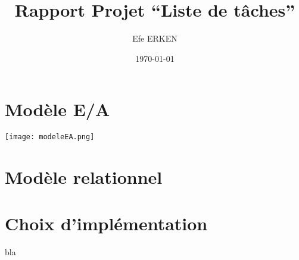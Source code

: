 \documentclass{article}
\author{Efe ERKEN}
\date{\today}
\title{Rapport Projet ``Liste de tâches''}
\begin{document}
\maketitle

\section{Modèle E/A}
\begin{center}
	\texttt{[image: modeleEA.png]}
\end{center}

\section{Modèle relationnel}


\section{Choix d'implémentation}
bla


\end{document}
